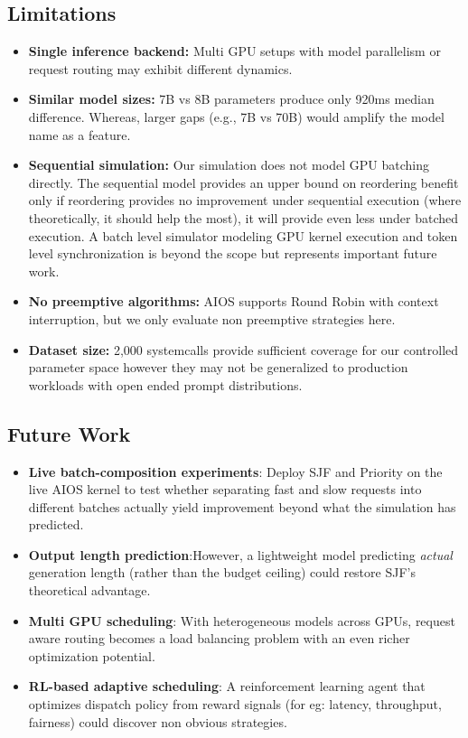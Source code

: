 \documentclass[conference]{IEEEtran}
\begin{document}
\subsection{Limitations}
\begin{itemize}
    \item \textbf{Single inference backend:} Multi GPU setups with model parallelism or request routing may exhibit different dynamics.
    \item \textbf{Similar model sizes:} 7B vs 8B parameters produce only 920ms median difference. Whereas, larger gaps (e.g., 7B vs 70B) would amplify the model name as a feature.
    \item \textbf{Sequential simulation:} Our simulation does not model GPU batching directly. The sequential model provides an upper bound on reordering benefit only if reordering provides no improvement under sequential execution (where theoretically, it should help the most), it will provide even less under batched execution. A batch level simulator modeling GPU kernel execution and token level synchronization is beyond the scope but represents important future work.
    \item \textbf{No preemptive algorithms:} AIOS supports Round Robin with context interruption, but we only evaluate non preemptive strategies  here.
    \item \textbf{Dataset size:} 2,000 systemcalls provide sufficient coverage for our controlled parameter space however they may not be generalized to production workloads with open ended prompt distributions.
\end{itemize}

\subsection{Future Work}
\begin{itemize}
    \item \textbf{Live batch-composition experiments}: Deploy SJF and Priority on the live AIOS kernel to test whether separating fast and slow requests into different batches actually yield improvement beyond what the simulation has predicted.
    \item \textbf{Output length prediction}:However, a lightweight model predicting \textit{actual} generation length (rather than the budget ceiling) could restore SJF's theoretical advantage.
    \item \textbf{Multi GPU scheduling}: With heterogeneous models across GPUs, request aware routing becomes a load balancing problem with an even richer optimization potential.
    \item \textbf{RL-based adaptive scheduling}: A reinforcement learning agent that optimizes dispatch policy from reward signals (for eg: latency, throughput, fairness) could discover non obvious strategies.
\end{itemize}
\end{document}
